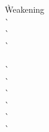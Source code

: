 \begin{description}
\begin{tabbing}
        \` Weakening \\
        \`  \\
        \`  \\
        \`  \\
       \\
        \`  \\
        \`  \\
        \`  \\
        \`  \\
        \`  \\
        \`  \- \\
  \end{tabbing}


\end{description}
